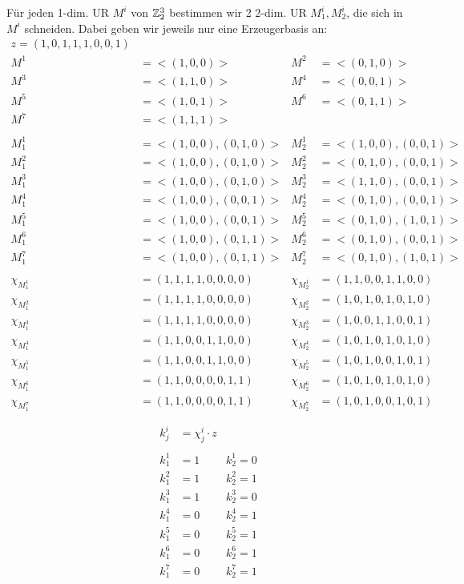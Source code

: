 Für jeden 1-dim. UR $M^i$ von $\mathbb{Z}_2^3$ bestimmen wir 2 2-dim. UR $M^i_1, M^i_2$, die sich in $M^i$ schneiden. Dabei geben wir jeweils nur eine Erzeugerbasis an:
\begin{align*}
z=(1,0,1,1,1,0,0,1)\\
M^1&=<(1, 0, 0)>&M^2&=<(0, 1, 0)>\\
M^3&=<(1, 1, 0)>&M^4&=<(0, 0, 1)>\\
M^5&=<(1, 0, 1)>&M^6&=<(0, 1, 1)>\\
M^7&=<(1, 1, 1)>\\\\
M^1_1&=<(1, 0, 0), (0, 1, 0)>&M^1_2&=<(1, 0, 0), (0, 0, 1)>\\
M^2_1&=<(1, 0, 0), (0, 1, 0)>&M^2_2&=<(0, 1, 0), (0, 0, 1)>\\
M^3_1&=<(1, 0, 0), (0, 1, 0)>&M^3_2&=<(1, 1, 0), (0, 0, 1)>\\
M^4_1&=<(1, 0, 0), (0, 0, 1)>&M^4_2&=<(0, 1, 0), (0, 0, 1)>\\
M^5_1&=<(1, 0, 0), (0, 0, 1)>&M^5_2&=<(0, 1, 0), (1, 0, 1)>\\
M^6_1&=<(1, 0, 0), (0, 1, 1)>&M^6_2&=<(0, 1, 0), (0, 0, 1)>\\
M^7_1&=<(1, 0, 0), (0, 1, 1)>&M^7_2&=<(0, 1, 0), (1, 0, 1)>\\\\
\chi_{M^1_1}&=(1, 1, 1, 1, 0, 0, 0, 0)&\chi_{M^1_2}&=(1, 1, 0, 0, 1, 1, 0, 0)\\
\chi_{M^2_1}&=(1, 1, 1, 1, 0, 0, 0, 0)&\chi_{M^2_2}&=(1, 0, 1, 0, 1, 0, 1, 0)\\
\chi_{M^3_1}&=(1, 1, 1, 1, 0, 0, 0, 0)&\chi_{M^3_2}&=(1, 0, 0, 1, 1, 0, 0, 1)\\
\chi_{M^4_1}&=(1, 1, 0, 0, 1, 1, 0, 0)&\chi_{M^4_2}&=(1, 0, 1, 0, 1, 0, 1, 0)\\
\chi_{M^5_1}&=(1, 1, 0, 0, 1, 1, 0, 0)&\chi_{M^5_2}&=(1, 0, 1, 0, 0, 1, 0, 1)\\
\chi_{M^6_1}&=(1, 1, 0, 0, 0, 0, 1, 1)&\chi_{M^6_2}&=(1, 0, 1, 0, 1, 0, 1, 0)\\
\chi_{M^7_1}&=(1, 1, 0, 0, 0, 0, 1, 1)&\chi_{M^7_2}&=(1, 0, 1, 0, 0, 1, 0, 1)\\\\
\end{align*}
\begin{align*}
k^i_j&=\chi^i_j\cdot z\\\\
k^1_1&=1&k^1_2=0\\
k^2_1&=1&k^2_2=1\\
k^3_1&=1&k^3_2=0\\
k^4_1&=0&k^4_2=1\\
k^5_1&=0&k^5_2=1\\
k^6_1&=0&k^6_2=1\\
k^7_1&=0&k^7_2=1\\
\end{align*}
